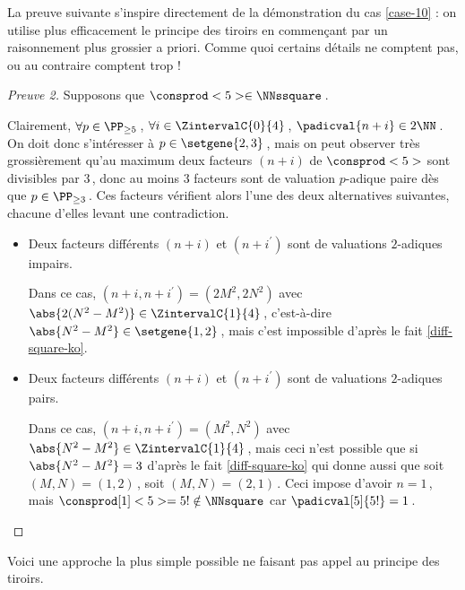 

La preuve suivante s'inspire directement de la démonstration du cas \ref{case-10} : on utilise plus efficacement le principe des tiroirs en commençant par un raisonnement plus grossier a priori. Comme quoi certains détails ne comptent pas, ou au contraire comptent trop !

\begin{proof}[Preuve 2]%
    Supposons que $\consprod<5> \in \NNssquare$\,.
    
    \smallskip
    
    Clairement, 
    $\forall p \in \PP_{\geq 5}$\,, 
    $\forall i \in \ZintervalC{0}{4}$\,, 
    $\padicval{n + i} \in 2 \NN$\,.
    On doit donc s'intéresser à $p \in \setgene{2, 3}$\,, mais on peut observer très grossièrement qu'au maximum deux facteurs $(n + i)$ de $\consprod<5>$ sont divisibles par $3$\,, donc au moins $3$ facteurs sont de valuation $p$-adique paire dès que $p \in \PP_{\geq 3}$\,.
    Ces facteurs vérifient alors l'une des deux alternatives suivantes,
    chacune d'elles levant une contradiction.
    \begin{itemize}
    	\medskip
		\item Deux facteurs différents $(n+i)$ et $(n+i^\prime)$ sont de valuations $2$-adiques impairs.
		
		\smallskip
		\noindent
		Dans ce cas, $(n+i, n+i^\prime) = (2 M^2, 2 N^2)$ avec $\abs{2(N^2 - M^2)} \in \ZintervalC{1}{4}$\,, c'est-à-dire $\abs{N^2 - M^2} \in \setgene{1, 2}$\,, mais c'est impossible d'après le fait \ref{diff-square-ko}.


    	\medskip
		\item Deux facteurs différents $(n+i)$ et $(n+i^\prime)$ sont de valuations $2$-adiques pairs.
		
		\smallskip
		\noindent
		Dans ce cas, $(n+i, n+i^\prime) = (M^2, N^2)$ avec $\abs{N^2 - M^2} \in \ZintervalC{1}{4}$\,, mais ceci n'est possible que si $\abs{N^2 - M^2} = 3$ d'après le fait \ref{diff-square-ko} qui donne aussi que soit $(M, N) = (1, 2)$\,, soit $(M, N) = (2, 1)$\,.
		Ceci impose d'avoir $n = 1$\,, mais $\consprod[1]<5> = 5! \notin \NNsquare$ car $\padicval[5]{5!} = 1$\,.
		\qedhere
    \end{itemize}
\end{proof}




Voici une approche la plus simple possible ne faisant pas appel au principe des tiroirs.


